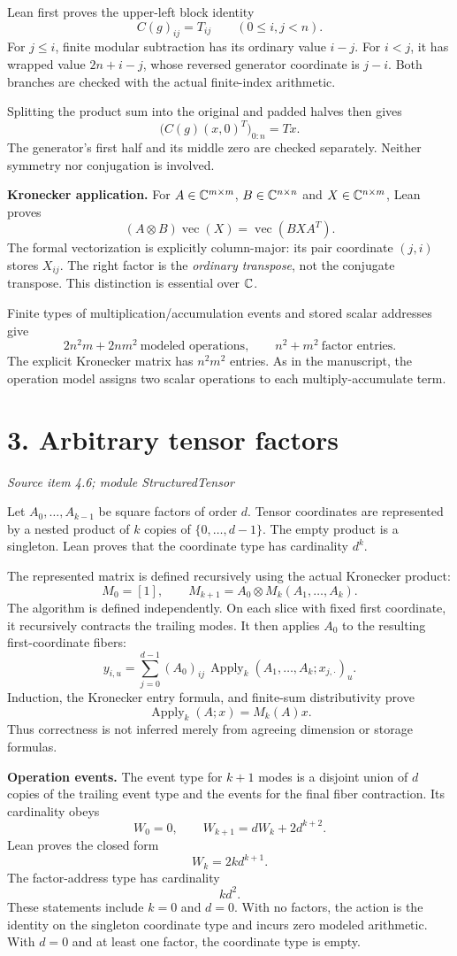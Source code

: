 \documentclass[11pt]{article}
\newcommand{\pageheading}[2]{\section*{\color{ink}#1}\textit{#2}\par}
\begin{document}
Lean first proves the upper-left block identity
\[
C(g)_{ij}=T_{ij}\qquad(0\le i,j<n).
\]
For $j\le i$, finite modular subtraction has its ordinary value $i-j$. For $i<j$, it has wrapped value $2n+i-j$, whose reversed generator coordinate is $j-i$. Both branches are checked with the actual finite-index arithmetic.

Splitting the product sum into the original and padded halves then gives
\[
\boxed{\bigl(C(g)(x,0)^T\bigr)_{0:n}=Tx.}
\]
The generator's first half and its middle zero are checked separately. Neither symmetry nor conjugation is involved.

\textbf{Kronecker application.} For $A\in\mathbb C^{m\times m}$, $B\in\mathbb C^{n\times n}$ and $X\in\mathbb C^{n\times m}$, Lean proves
\[
\boxed{(A\otimes B)\operatorname{vec}(X)=\operatorname{vec}(BXA^T).}
\]
The formal vectorization is explicitly column-major: its pair coordinate $(j,i)$ stores $X_{ij}$. The right factor is the \emph{ordinary transpose}, not the conjugate transpose. This distinction is essential over $\mathbb C$.

Finite types of multiplication/accumulation events and stored scalar addresses give
\[
\boxed{2n^2m+2nm^2\ \text{modeled operations},\qquad n^2+m^2\ \text{factor entries}.}
\]
The explicit Kronecker matrix has $n^2m^2$ entries. As in the manuscript, the operation model assigns two scalar operations to each multiply-accumulate term.

\newpage
\pageheading{3. Arbitrary tensor factors}{Source item 4.6; module StructuredTensor}
Let $A_0,\ldots,A_{k-1}$ be square factors of order $d$. Tensor coordinates are represented by a nested product of $k$ copies of $\{0,\ldots,d-1\}$. The empty product is a singleton. Lean proves that the coordinate type has cardinality $d^k$.

The represented matrix is defined recursively using the actual Kronecker product:
\[
M_0=[1],\qquad M_{k+1}=A_0\otimes M_k(A_1,\ldots,A_k).
\]
The algorithm is defined independently. On each slice with fixed first coordinate, it recursively contracts the trailing modes. It then applies $A_0$ to the resulting first-coordinate fibers:
\[
y_{i,u}=\sum_{j=0}^{d-1}(A_0)_{ij}\,
\operatorname{Apply}_{k}(A_1,\ldots,A_k;x_{j,\cdot})_u.
\]
Induction, the Kronecker entry formula, and finite-sum distributivity prove
\[
\boxed{\operatorname{Apply}_k(A;x)=M_k(A)x.}
\]
Thus correctness is not inferred merely from agreeing dimension or storage formulas.

\textbf{Operation events.} The event type for $k+1$ modes is a disjoint union of $d$ copies of the trailing event type and the events for the final fiber contraction. Its cardinality obeys
\[
W_0=0,\qquad W_{k+1}=dW_k+2d^{k+2}.
\]
Lean proves the closed form
\[
\boxed{W_k=2kd^{k+1}.}
\]
The factor-address type has cardinality
\[
\boxed{k d^2.}
\]
These statements include $k=0$ and $d=0$. With no factors, the action is the identity on the singleton coordinate type and incurs zero modeled arithmetic. With $d=0$ and at least one factor, the coordinate type is empty.
\end{document}

